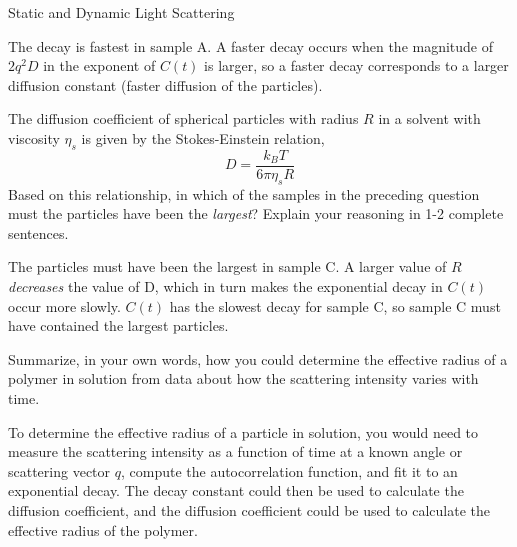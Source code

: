 \begin{activity}{Static and Dynamic Light Scattering}
\begin{ctqs}
		\begin{solution}[1.25in]{}
			The decay is fastest in sample A.  A faster decay occurs when the magnitude of $2q^2 D$ in the exponent of $C(t)$ is larger, so a faster decay corresponds to a larger diffusion constant (faster diffusion of the particles).
		\end{solution}
	
	\question The diffusion coefficient of spherical particles with radius $R$ in a solvent with viscosity $\eta_s$ is given by the Stokes-Einstein relation,
	\begin{equation*}
		D = \frac{ k_B T}{6\pi \eta_s R}
	\end{equation*}
	Based on this relationship, in which of the samples in the preceding question must the particles have been the \emph{largest}?  Explain your reasoning in 1-2 complete sentences. \label{\labelbase:ctq:stokeseinstein}
	
		\begin{solution}[1.25in]{}
			The particles must have been the largest in sample C.  A larger value of $R$ \textit{decreases} the value of D, which in turn makes the exponential decay in $C(t)$ occur more slowly.  $C(t)$ has the slowest decay for sample C, so sample C must have contained the largest particles.
		\end{solution}
	
	\question Summarize, in your own words, how you could determine the effective radius of a polymer in solution from data about how the scattering intensity varies with time.
	
		\begin{solution}[1.5in]{}
			To determine the effective radius of a particle in solution, you would need to measure the scattering intensity as a function of time at a known angle or scattering vector $q$, compute the autocorrelation function, and fit it to an exponential decay.  The decay constant could then be used to calculate the diffusion coefficient, and the diffusion coefficient could be used to calculate the effective radius of the polymer.
			
		\end{solution}

\end{ctqs}




\end{activity}
